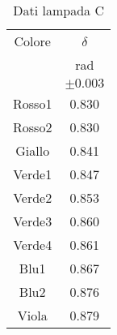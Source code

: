 \begin{table}[H]
\begin{center}
\caption{Dati lampada C}
\begin{tabular}{|c|c|}
\hline
Colore	&	$\delta$	    \\
    	&	rad	            \\
    	&	$\pm 0.003 $	\\ \hline
Rosso1	&	0.830		    \\
Rosso2	&	0.830   	   	\\
Giallo	&	0.841   		\\
Verde1	&	0.847	    	\\
Verde2	&	0.853	    	\\
Verde3	&	0.860    		\\
Verde4	&	0.861		    \\
Blu1	&	0.867	    	\\
Blu2	&	0.876   		\\
Viola	&	0.879	    	\\ \hline
\end{tabular}
\end{center}
\label{label}
\end{table}
